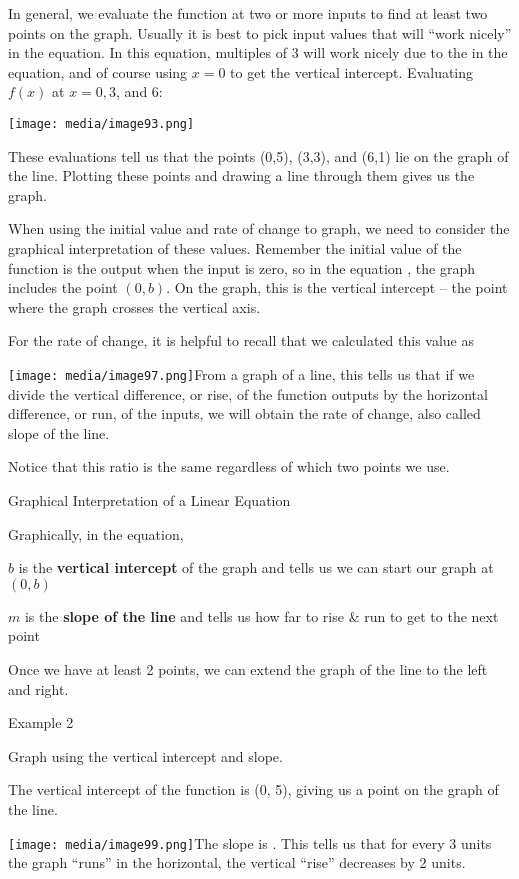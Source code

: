 In general, we evaluate the function at two or more inputs to find at
least two points on the graph. Usually it is best to pick input values
that will ``work nicely'' in the equation. In this equation, multiples
of 3 will work nicely due to the in the equation, and of course using
$x = 0$ to get the vertical intercept. Evaluating $f(x)$ at
$x = 0, 3$, and $6$:

\texttt{[image: media/image93.png]}

These evaluations tell us that the points (0,5), (3,3), and (6,1) lie on
the graph of the line. Plotting these points and drawing a line through
them gives us the graph.

When using the initial value and rate of change to graph, we need to
consider the graphical interpretation of these values. Remember the
initial value of the function is the output when the input is zero, so
in the equation , the graph includes the point $(0, b)$. On the
graph, this is the vertical intercept -- the point where the graph
crosses the vertical axis.

For the rate of change, it is helpful to recall that we calculated this
value as

\texttt{[image: media/image97.png]}From
a graph of a line, this tells us that if we divide the vertical
difference, or rise, of the function outputs by the horizontal
difference, or run, of the inputs, we will obtain the rate of change,
also called slope of the line.

Notice that this ratio is the same regardless of which two points we
use.

Graphical Interpretation of a Linear Equation

Graphically, in the equation,

$b$ is the \textbf{vertical intercept} of the graph and tells us we
can start our graph at $(0, b)$

$m$ is the \textbf{slope of the line} and tells us how far to rise
\& run to get to the next point

Once we have at least 2 points, we can extend the graph of the line to
the left and right.

Example 2

Graph using the vertical intercept and slope.

The vertical intercept of the function is (0, 5), giving us a point on
the graph of the line.

\texttt{[image: media/image99.png]}The
slope is . This tells us that for every 3 units the graph ``runs'' in
the horizontal, the vertical ``rise'' decreases by 2 units.

